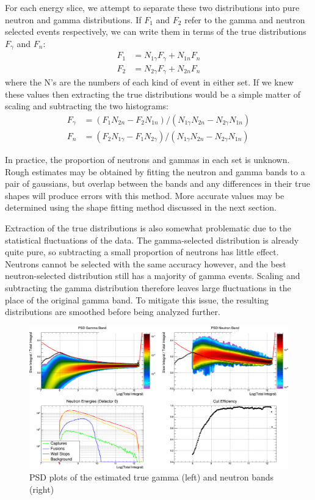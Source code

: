 For each energy slice, we attempt to separate these two distributions into pure neutron and gamma distributions.  
If $F_1$ and $F_2$ refer to the gamma and neutron selected events respectively, we can write them in terms of the true distributions $F_{\gamma}$ and $F_n$:
\begin{align}
F_1 & = N_{1\gamma} F_{\gamma} + N_{1n} F_n \\
F_2 & = N_{2\gamma} F_{\gamma} + N_{2n} F_n 
\end{align}
where the N's are the numbers of each kind of event in either set.
If we knew these values then extracting the true distributions would be a simple matter of scaling and subtracting the two histograms:
\begin{align}
F_{\gamma} & = (F_1 N_{2n} - F_2 N_{1n}) / (N_{1\gamma} N_{2n} - N_{2\gamma} N_{1n}) \\
F_n & = (F_2 N_{1\gamma} - F_1 N_{2\gamma}) / (N_{1\gamma} N_{2n} - N_{2\gamma} N_{1n})
\end{align}

In practice, the proportion of neutrons and gammas in each set is unknown.  
Rough estimates may be obtained by fitting the neutron and gamma bands to a pair of gaussians, but overlap between the bands and any differences in their true shapes will produce errors with this method.
More accurate values may be determined using the shape fitting method discussed in the next section.

Extraction of the true distributions is also somewhat problematic due to the statistical fluctuations of the data.  
The gamma-selected distribution is already quite pure, so subtracting a small proportion of neutrons has little effect.
Neutrons cannot be selected with the same accuracy however, and the best neutron-selected distribution still has a majority of gamma events.
Scaling and subtracting the gamma distribution therefore leaves large fluctuations in the place of the original gamma band.
To mitigate this issue, the resulting distributions are smoothed before being analyzed further.

\begin{figure}[h]
  \includegraphics[width=\textwidth]{neutrons/figures/PSD_fit.png}
  \caption{PSD plots of the estimated true gamma (left) and neutron bands (right)}
  \label{fig:psd_fit}
\end{figure}

